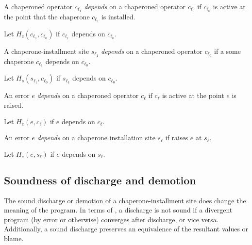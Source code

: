 \begin{definition}
A chaperoned operator $c_{\ell_1}$ \emph{depends} on a chaperoned operator $c_{\ell_0}$ if $c_{\ell_0}$ is active at the point that the chaperone $c_{\ell_1}$ is installed.
\end{definition}

Let $H_c(c_{\ell_1},c_{\ell_0})$ if $c_{\ell_1}$ depends on $c_{\ell_0}$.

\begin{definition}
A chaperone-installment site $s_{\ell_1}$ \emph{depends} on a chaperoned operator $c_{\ell_0}$ if a some chaperone $c_{\ell_1}$ depends on $c_{\ell_0}$.
\end{definition}

Let $H_s(s_{\ell_1},c_{\ell_0})$ if $s_{\ell_1}$ depends on $c_{\ell_0}$.

\begin{definition}
An error $e$ \emph{depends} on a chaperoned operator $c_\ell$ if $c_\ell$  is active at the point $e$ is raised.
\end{definition}

Let $H_e(e,c_\ell)$ if $e$ depends on $c_\ell$.

\begin{definition}
An error $e$ \emph{depends} on a chaperone installation site $s_\ell$ if  raises $e$ at $s_\ell$.
\end{definition}

Let $H_e(e,s_\ell)$ if $e$ depends on $s_\ell$.


\subsection{Soundness of discharge and demotion}

The sound discharge or demotion of a chaperone-installment site does change the meaning of the program.
In terms of \chapcalc, a discharge is not sound if a divergent program (by error or otherwise) converges after discharge, or vice versa.
Additionally, a sound discharge preserves an equivalence of the resultant values or blame.

